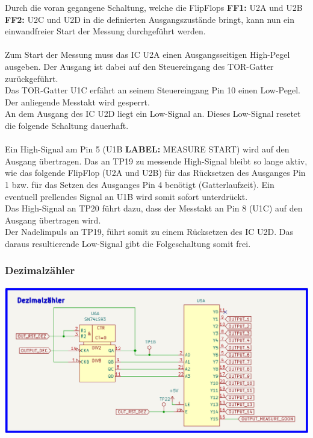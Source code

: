 \documentclass[a4paper,11pt]{scrartcl}
\begin{document}
Durch die voran gegangene Schaltung, welche die FlipFlops \textbf{FF1:} U2A und U2B \textbf{FF2:} U2C und U2D in die definierten Ausgangszustände bringt, kann nun ein einwandfreier Start der Messung durchgeführt werden. 
\\
\\
Zum Start der Messung muss das IC U2A einen Ausgangsseitigen High-Pegel ausgeben. Der Ausgang ist dabei auf den Steuereingang des TOR-Gatter zurückgeführt.
\\
Das TOR-Gatter U1C erfährt an seinem Steuereingang Pin 10 einen Low-Pegel. Der anliegende Messtakt wird gesperrt.
\\
An dem Ausgang des IC U2D liegt ein Low-Signal an. Dieses Low-Signal resetet die folgende Schaltung dauerhaft.  
\\
\\
Ein High-Signal am Pin 5 (U1B \textbf{LABEL:} MEASURE START) wird auf den Ausgang übertragen. Das an TP19 zu messende High-Signal bleibt so lange aktiv, wie das folgende FlipFlop (U2A und U2B) für das Rücksetzen des Ausganges Pin 1 bzw. für das Setzen des Ausganges Pin 4 benötigt (Gatterlaufzeit). Ein eventuell prellendes Signal an U1B wird somit sofort unterdrückt.
\\
Das High-Signal an TP20 führt dazu, dass der Messtakt an Pin 8 (U1C) auf den Ausgang übertragen wird. 
\\ 
Der Nadelimpuls an TP19, führt somit zu einem Rücksetzen des IC U2D. Das daraus resultierende Low-Signal gibt die Folgeschaltung somit frei.

\newpage
\subsubsection{Dezimalzähler}

\begin{center}
\includegraphics[width=16cm]{Bilder/Dezimalzähler.png}
\end{center}
\end{document}
